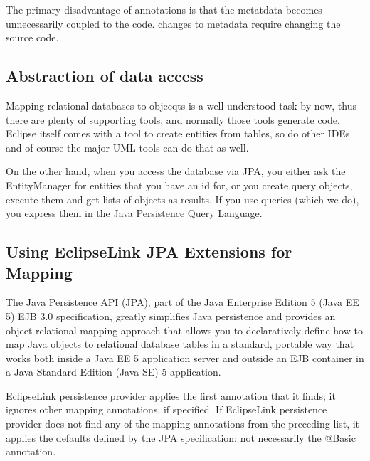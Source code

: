 The primary disadvantage of annotations is that the metatdata becomes
unnecessarily coupled to the code. changes to metadata require changing the
source code.

\subsection{Abstraction of data access}
Mapping relational databases to objecqts is a well-understood task by now, thus
there are plenty of supporting tools, and normally those tools generate code. Eclipse itself comes with a tool to create entities from tables, so do other IDEs and of course the major UML tools can do that as well.

On the other hand, when you access the database via JPA, you either ask the
EntityManager for entities that you have an id for, or you create query objects,
execute them and get lists of objects as results. If you use queries (which we
do), you express them in the Java Persistence Query Language.

\subsection{Using EclipseLink JPA Extensions for Mapping}
The Java Persistence API (JPA), part of the Java Enterprise Edition 5 (Java EE 5)
EJB 3.0 specification, greatly simplifies Java persistence and provides an object
relational mapping approach that allows you to declaratively define how to map
Java objects to relational database tables in a standard, portable way that works
both inside a Java EE 5 application server and outside an EJB container in a Java
Standard Edition (Java SE) 5 application.

EclipseLink persistence provider applies the first annotation that it finds; it
ignores other mapping annotations, if specified. If EclipseLink persistence
provider does not find any of the mapping annotations from the preceding list, it
applies the defaults defined by the JPA specification: not necessarily the @Basic
annotation.

